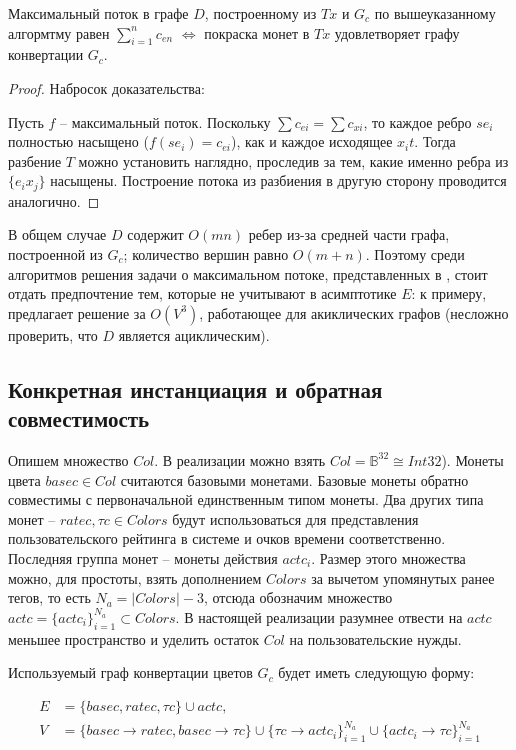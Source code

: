 \documentclass[specification,annotation]{itmo-student-thesis}
\begin{document}
\begin{lemma}
  Максимальный поток в графе $D$, построенному из $Tx$ и $G_c$ по
  вышеуказанному алгормтму равен $\sum_{i=1}^n{c_{en}}$
  $\Leftrightarrow$ покраска монет в $Tx$ удовлетворяет графу
  конвертации $G_c$.
\end{lemma}
\begin{proof}
  Набросок доказательства:

  Пусть $f$ -- максимальный поток. Поскольку $\sum{c_{ei}} =
  \sum{c_{xi}}$, то каждое ребро $se_i$ полностью насыщено ($f(se_i) =
  c_{ei}$), как и каждое исходящее $x_it$. Тогда разбение $T$ можно
  установить наглядно, проследив за тем, какие именно ребра из
  $\{e_ix_j\}$ насыщены. Построение потока из разбиения в другую
  сторону проводится аналогично.
\end{proof}

В общем случае $D$ содержит $O(mn)$ ребер из-за средней части графа,
построенной из $G_c$; количество вершин равно $O(m+n)$. Поэтому среди
алгоритмов решения задачи о максимальном потоке, представленных в
\cite{goldberg1988new}, стоит отдать предпочтение тем, которые не
учитывают в асимптотике $E$: к примеру, \cite{malhotra1978v}
предлагает решение за $O(V^3)$, работающее для акиклических графов
(несложно проверить, что $D$ является ациклическим).

\subsection{Конкретная инстанциация и обратная совместимость}

Опишем множество $Col$. В реализации можно взять $Col =
\mathbb{B}^{32} \cong Int32$). Монеты цвета $basec \in Col$ считаются
базовыми монетами. Базовые монеты обратно совместимы с первоначальной
единственным типом монеты. Два других типа монет -- $ratec, \tau c \in
Colors$ будут использоваться для представления пользовательского
рейтинга в системе и очков времени соответственно. Последняя группа
монет -- монеты действия $actc_i$. Размер этого множества можно, для
простоты, взять дополнением $Colors$ за вычетом упомянутых ранее
тегов, то есть $N_a = |Colors|-3$, отсюда обозначим множество $actc =
\{actc_i\}_{i=1}^{N_a} \subset Colors$. В настоящей реализации
разумнее отвести на $actc$ меньшее пространство и уделить остаток
$Col$ на пользовательские нужды.

Используемый граф конвертации цветов $G_c$ будет иметь следующую
форму:

\begin{align*}
  E &= \{basec, ratec, \tau c\} \cup actc,\\
  V &= \{basec \rightarrow ratec
  , basec \rightarrow \tau c\} \cup
  \{\tau c \rightarrow actc_i\}_{i=1}^{N_a} \cup
  \{actc_i \rightarrow \tau c\}_{i=1}^{N_a}
\end{align*}
\end{document}
